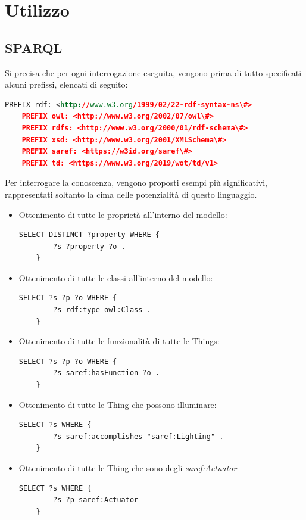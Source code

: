\documentclass[12pt,a4paper,openright,oneside]{report}
\begin{document}
\section{Utilizzo}

\subsection{SPARQL}
Si precisa che per ogni interrogazione eseguita, vengono prima di tutto specificati alcuni prefissi, elencati di seguito:

\begin{lstlisting}[language=XML]
	PREFIX rdf: <http://www.w3.org/1999/02/22-rdf-syntax-ns\#>
	PREFIX owl: <http://www.w3.org/2002/07/owl\#>
	PREFIX rdfs: <http://www.w3.org/2000/01/rdf-schema\#>
	PREFIX xsd: <http://www.w3.org/2001/XMLSchema\#>
	PREFIX saref: <https://w3id.org/saref\#>
	PREFIX td: <https://www.w3.org/2019/wot/td/v1>
\end{lstlisting}

Per interrogare la conoscenza, vengono proposti esempi più significativi, rappresentati soltanto la cima delle potenzialità di questo linguaggio. 

\begin{itemize}
	\item Ottenimento di tutte le proprietà all'interno del modello:
	\begin{lstlisting}[language=XML]
	SELECT DISTINCT ?property WHERE {
		?s ?property ?o .
	}
	\end{lstlisting}

	\item Ottenimento di tutte le classi all'interno del modello:
	\begin{lstlisting}[language=XML]
	SELECT ?s ?p ?o WHERE {
		?s rdf:type owl:Class .
	}
	\end{lstlisting}

	\item Ottenimento di tutte le funzionalità di tutte le Things:
	\begin{lstlisting}[language=XML]
	SELECT ?s ?p ?o WHERE {
		?s saref:hasFunction ?o .
	}
	\end{lstlisting}

	\item Ottenimento di tutte le Thing che possono illuminare:
	\begin{lstlisting}[language=XML]
	SELECT ?s WHERE {
		?s saref:accomplishes "saref:Lighting" .
	}
	\end{lstlisting}

	\item Ottenimento di tutte le Thing che sono degli \textit{saref:Actuator}
	\begin{lstlisting}[language=XML]
	SELECT ?s WHERE { 
		?s ?p saref:Actuator
	}
	\end{lstlisting}
\end{itemize}
\end{document}
